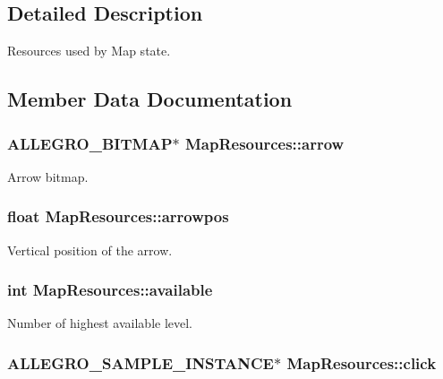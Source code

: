 \subsection{Detailed Description}
Resources used by Map state. 

\subsection{Member Data Documentation}
\hypertarget{structMapResources_aa90662f13dc99283ecd4f9fc3dd1f8a2}{
\subsubsection[{arrow}]{\setlength{\rightskip}{0pt plus 5cm}A\+L\+L\+E\+G\+R\+O\+\_\+\+B\+I\+T\+M\+A\+P$\ast$ Map\+Resources\+::arrow}}\label{structMapResources_aa90662f13dc99283ecd4f9fc3dd1f8a2}
Arrow bitmap. \hypertarget{structMapResources_ac27a26e5e5e399479d63d57359890016}{
\subsubsection[{arrowpos}]{\setlength{\rightskip}{0pt plus 5cm}float Map\+Resources\+::arrowpos}}\label{structMapResources_ac27a26e5e5e399479d63d57359890016}
Vertical position of the arrow. \hypertarget{structMapResources_a67de73f0e4860f35a6a8a8346fe7825d}{
\subsubsection[{available}]{\setlength{\rightskip}{0pt plus 5cm}int Map\+Resources\+::available}}\label{structMapResources_a67de73f0e4860f35a6a8a8346fe7825d}
Number of highest available level. \hypertarget{structMapResources_a57c95eb4998c4d6aa4c9458b289a976b}{
\subsubsection[{click}]{\setlength{\rightskip}{0pt plus 5cm}A\+L\+L\+E\+G\+R\+O\+\_\+\+S\+A\+M\+P\+L\+E\+\_\+\+I\+N\+S\+T\+A\+N\+C\+E$\ast$ Map\+Resources\+::click}}\label{structMapResources_a57c95eb4998c4d6aa4c9458b289a976b}
